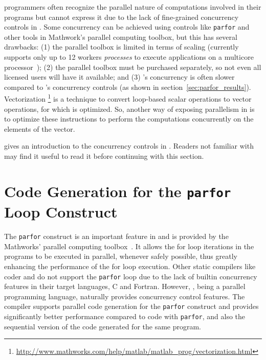\matlab programmers often recognize the parallel nature of computations involved
in their programs but cannot express it due to the lack of fine-grained
concurrency controls in \matlab. Some concurrency can be achieved using controls
like \verb|parfor| and other tools in Mathwork's parallel computing toolbox, but
this has several drawbacks:  (1) the parallel toolbox is limited in terms of
scaling (\matlab currently supports only up to 12 workers \emph{processes} to
execute applications on a multicore processor~\cite{pct}); (2) the parallel
toolbox must be purchased separately, so not even all licensed \matlab users
will have it available; and (3) \matlab's concurrency is often slower compared
to \xten's concurrency controls (as shown in section~\ref{sec:parfor_results}).
Vectorization
\footnote{\url{http://www.mathworks.com/help/matlab/matlab_prog/vectorization.html}}
is a technique to convert loop-based scalar operations to vector operations, for
which \matlab is optimized.   So, another way of exposing parallelism in \matlab
is to optimize these instructions to perform the computations concurrently on
the elements of the vector.

 gives an introduction to the concurrency controls in \xten.
Readers not familiar with \xten may find it useful to read it before continuing
with this section.



\section{Code Generation for the \matlab \texttt{parfor} Loop Construct}

The \matlab \texttt{parfor} construct is an important feature in \matlab and is
provided by the Mathworks' parallel computing toolbox~\cite{pct}. It allows the
for loop iterations in the \matlab programs to be executed in parallel, whenever
safely possible, thus greatly enhancing the performance of the for loop
execution. Other static \matlab compilers like \matlab coder and \mctwofor do
not support the \texttt{parfor} loop due to the lack of builtin concurrency
features in their target languages, C and Fortran. However, \xten, being a
parallel programming language, naturally provides concurrency control features.
The \mixten compiler supports parallel code generation for the \matlab
\texttt{parfor} construct and provides significantly better performance compared
to \matlab code with \texttt{parfor}, and also the sequential version of the
\xten code generated for the same program.   

